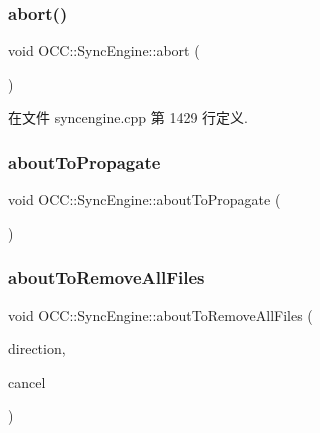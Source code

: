 \subsubsection{\texorpdfstring{abort()}{abort()}}
{\footnotesize\ttfamily void O\+C\+C\+::\+Sync\+Engine\+::abort (\begin{DoxyParamCaption}{ }\end{DoxyParamCaption})}



在文件 syncengine.\+cpp 第 1429 行定义.

\mbox{\label{class_o_c_c_1_1_sync_engine_a40f30a576b2679288b6cda1601c354b5}} 
\subsubsection{\texorpdfstring{about\+To\+Propagate}{aboutToPropagate}}
{\footnotesize\ttfamily void O\+C\+C\+::\+Sync\+Engine\+::about\+To\+Propagate (\begin{DoxyParamCaption}\item[{\hyperlink{namespace_o_c_c_af407f0fdf0476e0bfce478be3d0e441e}{Sync\+File\+Item\+Vector} \&}]{ }\end{DoxyParamCaption})\hspace{0.3cm}{\ttfamily [signal]}}

\mbox{\label{class_o_c_c_1_1_sync_engine_a9702dae2961cd351fe034e4ef5dfbf1a}} 
\subsubsection{\texorpdfstring{about\+To\+Remove\+All\+Files}{aboutToRemoveAllFiles}}
{\footnotesize\ttfamily void O\+C\+C\+::\+Sync\+Engine\+::about\+To\+Remove\+All\+Files (\begin{DoxyParamCaption}\item[{\hyperlink{class_o_c_c_1_1_sync_file_item_ad6db6c9821da051d0c790fb50603922b}{Sync\+File\+Item\+::\+Direction}}]{direction,  }\item[{bool $\ast$}]{cancel }\end{DoxyParamCaption})\hspace{0.3cm}{\ttfamily [signal]}}

